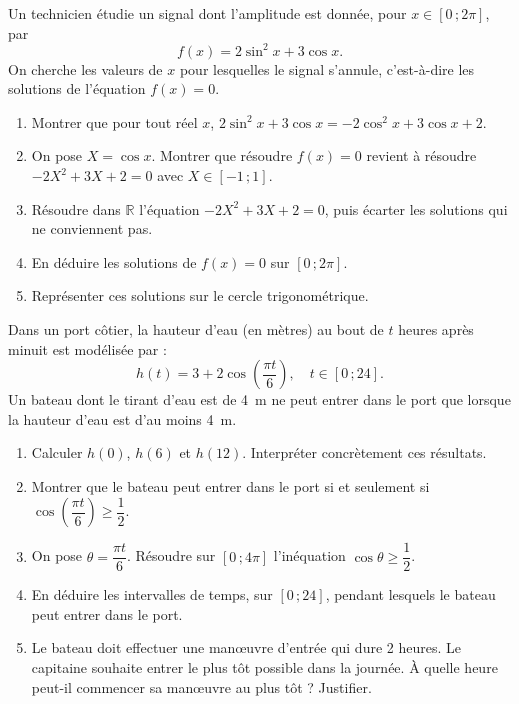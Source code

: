 \documentclass[11pt]{article}
\begin{document}
\begin{exercice}
Un technicien étudie un signal dont l'amplitude est donnée, pour $x \in [0\,;2\pi]$, par
\[ f(x) = 2\sin^2 x + 3\cos x. \]
On cherche les valeurs de $x$ pour lesquelles le signal s'annule, c'est-à-dire les solutions de l'équation $f(x) = 0$.
\begin{enumerate}
\item Montrer que pour tout réel $x$, $2\sin^2 x + 3\cos x = -2\cos^2 x + 3\cos x + 2$.
\item On pose $X = \cos x$. Montrer que résoudre $f(x) = 0$ revient à résoudre $-2X^2 + 3X + 2 = 0$ avec $X \in [-1\,;1]$.
\item Résoudre dans $\mathbb{R}$ l'équation $-2X^2 + 3X + 2 = 0$, puis écarter les solutions qui ne conviennent pas.
\item En déduire les solutions de $f(x) = 0$ sur $[0\,;2\pi]$.
\item Représenter ces solutions sur le cercle trigonométrique.
\end{enumerate}
\end{exercice}

\begin{exercice}
Dans un port côtier, la hauteur d'eau (en mètres) au bout de $t$ heures après minuit est modélisée par :
\[ h(t) = 3 + 2\cos\left(\dfrac{\pi t}{6}\right), \quad t \in [0\,;24]. \]
Un bateau dont le tirant d'eau est de \SI{4}{m} ne peut entrer dans le port que lorsque la hauteur d'eau est d'au moins \SI{4}{m}.
\begin{enumerate}
\item Calculer $h(0)$, $h(6)$ et $h(12)$. Interpréter concrètement ces résultats.
\item Montrer que le bateau peut entrer dans le port si et seulement si $\cos\left(\dfrac{\pi t}{6}\right) \geq \dfrac{1}{2}$.
\item On pose $\theta = \dfrac{\pi t}{6}$. Résoudre sur $[0\,;4\pi]$ l'inéquation $\cos\theta \geq \dfrac{1}{2}$.
\item En déduire les intervalles de temps, sur $[0\,;24]$, pendant lesquels le bateau peut entrer dans le port.
\item Le bateau doit effectuer une manœuvre d'entrée qui dure 2 heures. Le capitaine souhaite entrer le plus tôt possible dans la journée. À quelle heure peut-il commencer sa manœuvre au plus tôt ? Justifier.
\end{enumerate}
\end{exercice}
\end{document}

